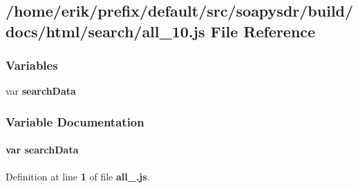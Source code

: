 \subsection{/home/erik/prefix/default/src/soapysdr/build/docs/html/search/all\+\_\+10.js File Reference}
\label{all__10_8js}
\subsubsection*{Variables}
\begin{DoxyCompactItemize}
\item 
var {\bf search\+Data}
\end{DoxyCompactItemize}


\subsubsection{Variable Documentation}
\paragraph[{search\+Data}]{\setlength{\rightskip}{0pt plus 5cm}var search\+Data}\label{all__10_8js_ad01a7523f103d6242ef9b0451861231e}


Definition at line {\bf 1} of file {\bf all\+\_.\+js}.

